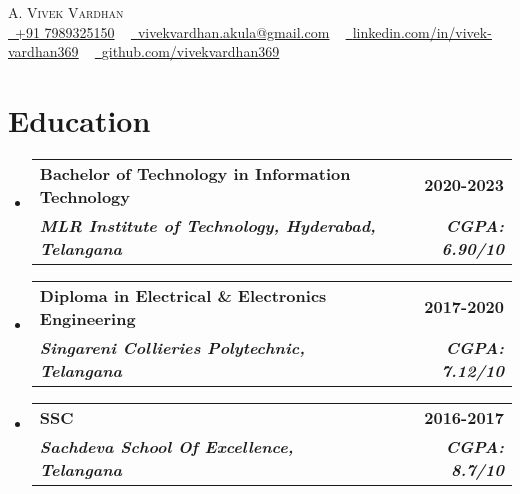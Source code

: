 \documentclass[letterpaper,11pt]{article}
\makeatletter
\newcommand{\resumeSubheading}[4]{
  \vspace{-2pt}\item
    \begin{tabular*}{1.0\textwidth}[t]{l@{\extracolsep{\fill}}r}
      \textbf{#1} & \textbf{\small #2} \\
      \textit{\small#3} & \textit{\small #4} \\
    \end{tabular*}\vspace{-7pt}
}
\newcommand{\resumeSubHeadingListStart}{\begin{itemize}[leftmargin=0.0in, label={}]}
\newcommand{\resumeSubHeadingListEnd}{\end{itemize}}
\makeatother
\begin{document}
\begin{center}
    {\Huge \scshape A. Vivek Vardhan} \\ \vspace{1pt}
    \small 
    \href{tel:917989325150}{\raisebox{-0.1\height}\faPhone\ +91 7989325150} ~ 
    \href{mailto:vivekvardhan.akula@gmail.com}{\raisebox{-0.2\height}\faEnvelope\ \underline{vivekvardhan.akula@gmail.com}} ~ 
    \href{https://www.linkedin.com/in/vivek-vardhan369}{\raisebox{-0.2\height}\faLinkedin\ \underline{linkedin.com/in/vivek-vardhan369}} ~ 
    \href{https://github.com/vivekvardhan369}{\raisebox{-0.2\height}\faGithub\ \underline{github.com/vivekvardhan369}} 
    \vspace{-6pt}
\end{center}





\section{Education}
  \resumeSubHeadingListStart
    \resumeSubheading
      {\textbf{Bachelor of Technology in Information Technology}}{\textbf{2020-2023}}
      {\textbf{MLR Institute of Technology, Hyderabad, Telangana}}{\textbf{CGPA: 6.90/10}}
    \resumeSubheading
      {\textbf{Diploma in Electrical \& Electronics Engineering}}{\textbf{2017-2020}}
      {\textbf{Singareni Collieries Polytechnic, Telangana}}{\textbf{CGPA: 7.12/10}}
    \resumeSubheading
      {\textbf{SSC}}{\textbf{2016-2017}}
      {\textbf{Sachdeva School Of Excellence, Telangana}}{\textbf{CGPA: 8.7/10}}
  \resumeSubHeadingListEnd
\end{document}
